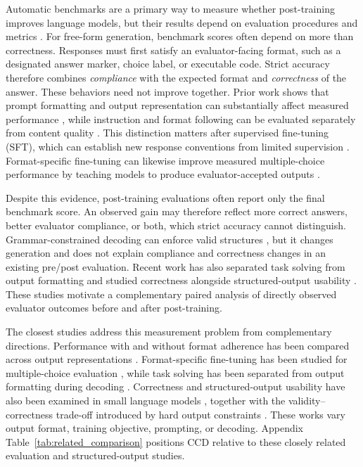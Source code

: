 \documentclass{article}
\begin{document}
Automatic benchmarks are a primary way to measure whether post-training
improves language models, but their results depend on evaluation procedures
and metrics \citep{liang2023holistic}. For free-form generation, benchmark
scores often depend on more than correctness. Responses must first satisfy an
evaluator-facing format, such as a designated answer marker, choice label, or
executable code. Strict accuracy therefore combines \emph{compliance} with the
expected format and \emph{correctness} of the answer. These behaviors need not
improve together. Prior work shows that prompt formatting and output
representation can substantially affect measured performance
\citep{sclar2024quantifying,long-etal-2025-llms,ravikumar-etal-2026-lost},
while instruction and format following can be evaluated separately from
content quality \citep{zhou2023ifeval,xia-etal-2024-fofo}. This distinction
matters after supervised fine-tuning (SFT), which can establish new response
conventions from limited supervision
\citep{zhou2023lima,pmlr-v202-longpre23a}. Format-specific fine-tuning can
likewise improve measured multiple-choice performance by teaching models to
produce evaluator-accepted outputs \citep{bunn-etal-2025-fine}.

Despite this evidence, post-training evaluations often report only the final
benchmark score. An observed gain may therefore reflect more correct answers,
better evaluator compliance, or both, which strict accuracy cannot
distinguish. Grammar-constrained decoding can enforce valid structures
\citep{geng-etal-2023-grammar,pmlr-v267-banerjee25a}, but it changes
generation and does not explain compliance and correctness changes in an
existing pre/post evaluation. Recent work has also separated task solving
from output formatting and studied correctness alongside structured-output
usability \citep{deng-etal-2026-decoupling,galeone2026correct}. These studies
motivate a complementary paired analysis of directly observed evaluator
outcomes before and after post-training.

The closest studies address this measurement problem from complementary
directions. Performance with and without format adherence has been compared
across output representations \citep{long-etal-2025-llms}. Format-specific
fine-tuning has been studied for multiple-choice evaluation
\citep{bunn-etal-2025-fine}, while task solving has been separated from output
formatting during decoding \citep{deng-etal-2026-decoupling}. Correctness and
structured-output usability have also been examined in small language models
\citep{galeone2026correct}, together with the validity--correctness trade-off
introduced by hard output constraints \citep{ray2026constrainttax}. These
works vary output format, training objective, prompting, or decoding.
Appendix Table~\ref{tab:related_comparison} positions CCD relative to these
closely related evaluation and structured-output studies.
\end{document}
